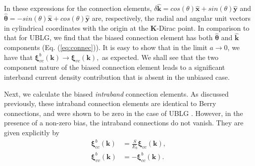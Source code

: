 \documentclass[twocolumn,secnumarabic,amssymb, nobibnotes, aps, prd, superscriptaddress]{revtex4-1}
\begin{document}
In these expressions for the connection elements, $\delta\hat{\mathbf{k}}=cos(\theta)\hat{\mathbf{x}}+sin(\theta)\hat{\mathbf{y}}$ and $\hat{\mathbf{\theta}}=-sin(\theta)\hat{\mathbf{x}}+cos(\theta)\hat{\mathbf{y}}$ are, respectively, the radial and angular unit vectors in cylindrical coordinates with the origin at the $\mathbf{K}$-Dirac point. In comparison to that for UBLG, we find that the biased connection element has both $\hat{\mathbf{\theta}}$ and $\hat{\mathbf{k}}$ components (Eq. (\ref{eq:connec})). It is easy to show that in the limit $a\rightarrow0$, we have that $\mathbf{\xi}_{vc}^{b}(\mathbf{k})\rightarrow\mathbf{\xi}_{vc}(\mathbf{k}),$ as expected. We shall see that the two component nature of the biased connection element leads to a significant interband current density contribution that is absent in the unbiased case.

Next, we calculate the biased \textit{intraband} connection elements. As discussed previously, these intraband connection elements are identical to Berry connections\cite{chang1996berry}\cite{xiao2010berry}, and were shown to be zero in the case of UBLG \cite{mcgouran2016nonlinear}. However, in the presence of a non-zero bias, the intraband connections do not vanish. They are given explicitly by 
\begin{equation}
\begin{aligned}\mathbf{\xi}_{cc}^{b}(\mathbf{k}) & =\frac{S}{E_{b}}\mathbf{\xi}_{vc}(\mathbf{k}),\\
\mathbf{\xi}_{vv}^{b}(\mathbf{k}) & =-\mathbf{\xi}_{cc}^{b}(\mathbf{k}).
\end{aligned}
\end{equation}
\end{document}
